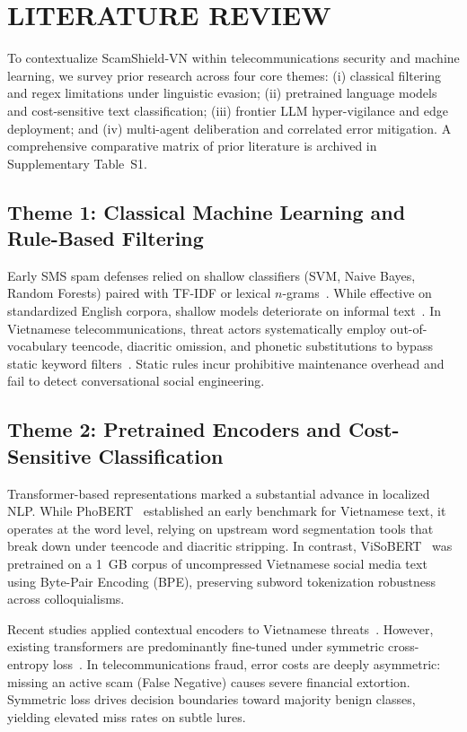 \documentclass[journal]{IEEEtran}
\begin{document}
\section{LITERATURE REVIEW}
\label{sec:literature}

To contextualize ScamShield-VN within telecommunications security and machine learning, we survey prior research across four core themes: (i) classical filtering and regex limitations under linguistic evasion; (ii) pretrained language models and cost-sensitive text classification; (iii) frontier LLM hyper-vigilance and edge deployment; and (iv) multi-agent deliberation and correlated error mitigation. A comprehensive comparative matrix of prior literature is archived in Supplementary Table~S1.

\subsection{Theme 1: Classical Machine Learning and Rule-Based Filtering}
Early SMS spam defenses relied on shallow classifiers (SVM, Naive Bayes, Random Forests) paired with TF-IDF or lexical $n$-grams~\cite{saeed2023method, xie2025comparing, ghourabi2023enhancing}. While effective on standardized English corpora, shallow models deteriorate on informal text~\cite{xie2025comparing}. In Vietnamese telecommunications, threat actors systematically employ out-of-vocabulary teencode, diacritic omission, and phonetic substitutions to bypass static keyword filters~\cite{seo2024ondevice}. Static rules incur prohibitive maintenance overhead and fail to detect conversational social engineering.

\subsection{Theme 2: Pretrained Encoders and Cost-Sensitive Classification}
Transformer-based representations marked a substantial advance in localized NLP. While PhoBERT~\cite{nguyen2020phobert} established an early benchmark for Vietnamese text, it operates at the word level, relying on upstream word segmentation tools that break down under teencode and diacritic stripping. In contrast, ViSoBERT~\cite{nguyen2023visobert} was pretrained on a 1~GB corpus of uncompressed Vietnamese social media text using Byte-Pair Encoding (BPE), preserving subword tokenization robustness across colloquialisms.

Recent studies applied contextual encoders to Vietnamese threats~\cite{tuan2023evaluating, cam2026vnsed, nguyenxuan2026mixed}. However, existing transformers are predominantly fine-tuned under symmetric cross-entropy loss~\cite{elkan2001foundations}. In telecommunications fraud, error costs are deeply asymmetric: missing an active scam (False Negative) causes severe financial extortion. Symmetric loss drives decision boundaries toward majority benign classes, yielding elevated miss rates on subtle lures.
\end{document}
